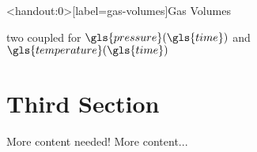 \documentclass[compress, english]{beamer}%
\begin{document}
\begin{frame}<handout:0>[label=gas-volumes]{Gas Volumes\autocites{eriksson_modeling_2007}[30]{guzzella_introduction_2010}{hendricks_isothermal_2001}{mathworks_constant_2018}}
\centering
\begin{figure}
	\def\svgwidth{0.8\textwidth}
	
\end{figure}
\pause
\textrightarrow{} two coupled  for \(\gls{pressure}(\gls{time})\) and \(\gls{temperature}(\gls{time})\)
\end{frame}
\section{Third Section}
\begin{frame}{More content needed!}
	More content...
\end{frame}
\end{document}
